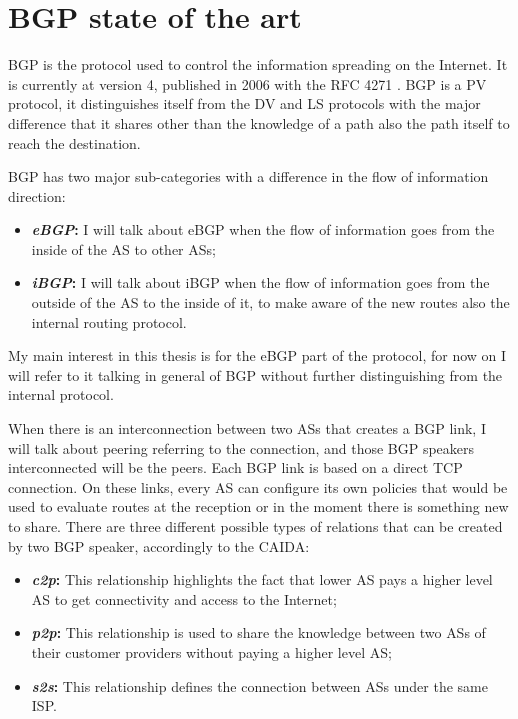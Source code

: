 \chapter{BGP state of the art}
\label{cha:bgp_art}

\ac{BGP} is the protocol used to control the information spreading on the Internet.
It is currently at version \num{4}, published in \num{2006} with the \ac{RFC} \num{4271}
\cite{rfc4271}.
\ac{BGP} is a \ac{PV} protocol, it distinguishes itself from the \ac{DV} and \ac{LS}
protocols with the major difference that it shares other than the knowledge of
a path also the path itself to reach the destination.

\ac{BGP} has two major sub-categories with a difference in the flow of information
direction:
\begin{itemize}
	\item \textbf{\textit{\ac{eBGP}}:} I will talk about \ac{eBGP} when the
		flow of information goes from the inside
		of the \ac{AS} to other \acp{AS};
	\item \textbf{\textit{\ac{iBGP}}:} I will talk about \ac{iBGP} when the flow
		of information goes from the outside of the \ac{AS} to the inside of
		it, to make aware of the new routes also the internal routing protocol.
\end{itemize}

My main interest in this thesis is for the \ac{eBGP} part of the protocol, for
now on I will refer to it talking in general of \ac{BGP} without further distinguishing
from the internal protocol.

When there is an interconnection between two \acp{AS} that creates a \ac{BGP}
link, I will talk about peering referring to the connection, and those \ac{BGP}
speakers interconnected will be the peers.
Each \ac{BGP} link is based on a direct \ac{TCP} connection.
On these links, every \ac{AS} can configure its own policies that would be used
to evaluate routes at the reception or in the moment there is something new
to share.
There are three different possible types of relations that can be created by two
\ac{BGP} speaker, accordingly to the \ac{CAIDA}:

\begin{itemize}
	\item \textbf{\textit{\ac{c2p}}:} This relationship highlights the fact that
		lower \ac{AS} pays a higher level \ac{AS} to get connectivity and access
		to the Internet;
	\item \textbf{\textit{\ac{p2p}}:} This relationship is used to share the knowledge
		between two \acp{AS} of their customer providers without paying a higher
		level \ac{AS};
	\item \textbf{\textit{\ac{s2s}}:} This relationship defines the connection
		between \acp{AS} under the same \ac{ISP}.
\end{itemize}

